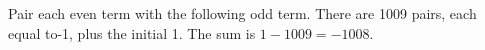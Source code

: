Pair each even term with the following odd term. There are 1009 pairs, each equal to-1, plus the initial 1. The sum is $1-1009=\boxed{-1008}$.
